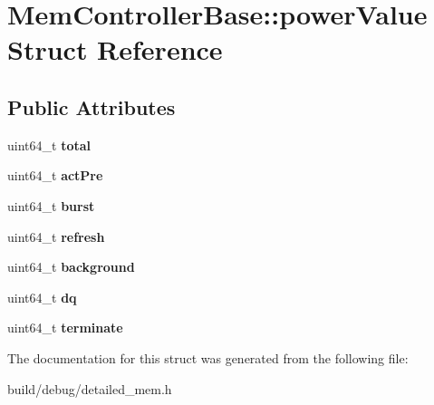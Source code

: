 \hypertarget{structMemControllerBase_1_1powerValue}{\section{Mem\-Controller\-Base\-:\-:power\-Value Struct Reference}
\label{structMemControllerBase_1_1powerValue}
}
\subsection*{Public Attributes}
\begin{DoxyCompactItemize}
\item 
\hypertarget{structMemControllerBase_1_1powerValue_a0060a736b0ccc8ed8ce2f79852df581f}{uint64\-\_\-t {\bfseries total}}\label{structMemControllerBase_1_1powerValue_a0060a736b0ccc8ed8ce2f79852df581f}

\item 
\hypertarget{structMemControllerBase_1_1powerValue_aea83fe4e96bbd96403a4fca259a66e38}{uint64\-\_\-t {\bfseries act\-Pre}}\label{structMemControllerBase_1_1powerValue_aea83fe4e96bbd96403a4fca259a66e38}

\item 
\hypertarget{structMemControllerBase_1_1powerValue_a57ce4e225c0ed111e3b0eb993954acee}{uint64\-\_\-t {\bfseries burst}}\label{structMemControllerBase_1_1powerValue_a57ce4e225c0ed111e3b0eb993954acee}

\item 
\hypertarget{structMemControllerBase_1_1powerValue_aa0563aa3d1b86de87f0425fdb2fab301}{uint64\-\_\-t {\bfseries refresh}}\label{structMemControllerBase_1_1powerValue_aa0563aa3d1b86de87f0425fdb2fab301}

\item 
\hypertarget{structMemControllerBase_1_1powerValue_a066991b7e8d20754418d04003f94dc74}{uint64\-\_\-t {\bfseries background}}\label{structMemControllerBase_1_1powerValue_a066991b7e8d20754418d04003f94dc74}

\item 
\hypertarget{structMemControllerBase_1_1powerValue_aa0e261b1c314d19804a466e086cf3798}{uint64\-\_\-t {\bfseries dq}}\label{structMemControllerBase_1_1powerValue_aa0e261b1c314d19804a466e086cf3798}

\item 
\hypertarget{structMemControllerBase_1_1powerValue_aa9b0fc6c03060a3a03d2d9defd6da36b}{uint64\-\_\-t {\bfseries terminate}}\label{structMemControllerBase_1_1powerValue_aa9b0fc6c03060a3a03d2d9defd6da36b}

\end{DoxyCompactItemize}


The documentation for this struct was generated from the following file\-:\begin{DoxyCompactItemize}
\item 
build/debug/detailed\-\_\-mem.\-h\end{DoxyCompactItemize}
